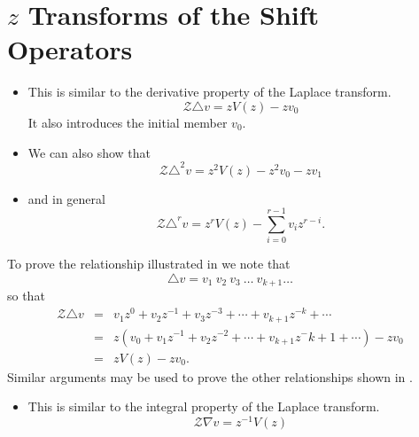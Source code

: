 \section*{$z$ Transforms of the Shift Operators}

\begin{slide}\label{slide:l8s2}

\begin{itemize}
\item  This is similar to the derivative property of the Laplace
  transform.
 \[\mathcal{Z}\triangle v = z V(z) - zv_0\] It also introduces the initial member $v_0$.

\item  We can also show that
  \[\mathcal{Z}\triangle^2 v = z^2 V(z) - z^2 v_0 - z v_1\]
\item and in general
  \[\mathcal{Z}\triangle^r v = z^r V(z) - \sum_{i=0}^{r-1} v_i z^{r-i}.\]

\end{itemize}

\end{slide}

To prove the relationship illustrated in  we note
that
\[\triangle v = v_1\ v_2\ v_3\ \ldots\ v_{k+1}\ldots\]
so that
\begin{eqnarray*}
  \mathcal{Z}\triangle v & = & v_1 z^0 + v_2 z^{-1} + v_3 z^{-3} + \cdots
  + v_{k+1}z^{-k}+\cdots \\
& = & z(v_0 + v_1 z^{-1} + v_2 z^{-2} + \cdots
  + v_{k+1}z^-{k+1}+\cdots)-zv_0\\
&=& zV(z) - zv_0.
\end{eqnarray*}
Similar arguments may be used to prove the other relationships
shown in .

\begin{slide}\label{slide:l8s3}
\begin{itemize}
\item  This is similar to the integral property of the Laplace
   transform.
  \[\mathcal{Z}\nabla v = z^{-1} V(z)\]
\end{itemize}

\end{slide}

